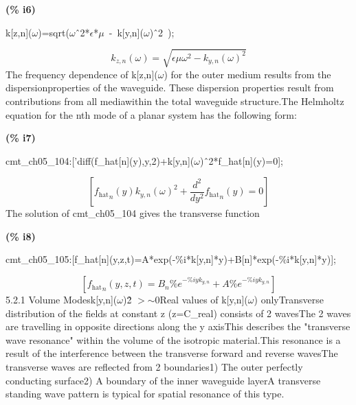 \documentclass[fleqn]{article}
\begin{document}
\noindent
\begin{minipage}[t]{4.000000em}\color{red}\bfseries
(\% i6)	
\end{minipage}
\begin{minipage}[t]{\textwidth}\color{blue}
k[z,n](\ensuremath{\omega})=sqrt(\ensuremath{\omega}\^\ 2*\ensuremath{\epsilon}*\ensuremath{\mu}\ -\ k[y,n](\ensuremath{\omega})\^\ 2\ );
\end{minipage}
\[\displaystyle \tag{\% o6} 
{k_{z,n}}\left( \omega \right) =\sqrt{\epsilon  \mu  {{\omega }^{2}}-{{{k_{y,n}}\left( \omega \right) }^{2}}}\mbox{}
\]
The frequency dependence of k[z,n](\ensuremath{\omega}) for the outer medium results from the dispersionproperties of the waveguide. These dispersion properties result from contributions from all mediawithin the total waveguide structure.The Helmholtz equation for the nth mode of a planar system has the following form:


\noindent
\begin{minipage}[t]{4.000000em}\color{red}\bfseries
(\% i7)	
\end{minipage}
\begin{minipage}[t]{\textwidth}\color{blue}
cmt\_ch05\_104:['diff(f\_hat[n](y),y,2)+k[y,n](\ensuremath{\omega})\^\ 2*f\_hat[n](y)=0];
\end{minipage}
\[\displaystyle \tag{\% o7} 
\left[ {{{f_{\ensuremath{\mathrm{hat}}}}}_n}(y) {{{k_{y,n}}\left( \omega \right) }^{2}}+\frac{{{d}^{2}}}{d {{y}^{2}}} {{{f_{\ensuremath{\mathrm{hat}}}}}_n}(y)=0\right] \mbox{}
\]
The solution of cmt\_ch05\_104 gives the transverse function


\noindent
\begin{minipage}[t]{4.000000em}\color{red}\bfseries
(\% i8)	
\end{minipage}
\begin{minipage}[t]{\textwidth}\color{blue}
cmt\_ch05\_105:[f\_hat[n](y,z,t)=A*exp(-\%i*k[y,n]*y)+B[n]*exp(-\%i*k[y,n]*y)];
\end{minipage}
\[\displaystyle \tag{\% o8} 
\left[ {{{f_{\ensuremath{\mathrm{hat}}}}}_n}\left( y\operatorname{,}z\operatorname{,}t\right) ={B_n} {{\% e}^{-\% i y {k_{y,n}}}}+A {{\% e}^{-\% i y {k_{y,n}}}}\right] \mbox{}
\]
5.2.1 Volume Modesk[y,n](\ensuremath{\omega})\^ 2 \ensuremath{>}\ensuremath{\sim }0Real values of k[y,n](\ensuremath{\omega}) onlyTransverse distribution of the fields at constant z (z=C\_real) consists of 2 wavesThe 2 waves are travelling in opposite directions along the y axisThis describes the "transverse wave resonance" within the volume of the isotropic material.This resonance is a result of the interference between the transverse forward and reverse wavesThe transverse waves are reflected from 2 boundaries1) The outer perfectly conducting surface2) A boundary of the inner waveguide layerA transverse standing wave pattern is typical for spatial resonance of this type.
\end{document}
